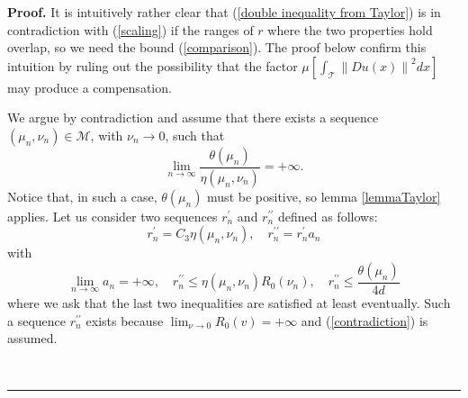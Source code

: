 \documentclass[11pt]{preprint}
\newenvironment{proof}[1][Proof]{\textbf{#1.} }{\ \rule{0.5em}{0.5em}}
\begin{document}
\begin{proof}
It is intuitively rather clear that (\ref{double inequality from Taylor}) is
in contradiction with (\ref{scaling}) if the ranges of $r$ where the two
properties hold overlap, so we need the bound (\ref{comparison}). The proof below confirm this intuition by ruling out the possibility that the factor $\mu\left[
\int_{\mathcal{T}}\left\|  Du\left(  x\right)  \right\|  ^{2}dx\right]  $ may
produce a compensation.

We argue by contradiction and assume that there exists a sequence $\left(
\mu_{n},\nu_{n}\right)  \in\mathcal{M}$, with $\nu_{n}\rightarrow0$, such
that
\begin{equation}
\lim_{n\rightarrow\infty}\frac{\theta\left(  \mu_{n}\right)  }{\eta\left(
\mu_{n},\nu_{n}\right)  }=+\infty.\label{contradiction}%
\end{equation}
Notice that, in such a case, $\theta\left(  \mu_{n}\right)  $ must be
positive, so lemma \ref{lemmaTaylor} applies. Let us consider two sequences
$r_{n}^{\prime}$ and $r_{n}^{\prime\prime}$ defined as follows:
\[
r_{n}^{\prime}=C_{3}\eta\left(  \mu_{n},\nu_{n}\right)  ,\quad r_{n}%
^{\prime\prime}=r_{n}^{\prime}a_{n}%
\]
with
\[
\lim_{n\rightarrow\infty}a_{n}=+\infty,\quad r_{n}^{\prime\prime}\leq
\eta\left(  \mu_{n},\nu_{n}\right)  R_{0}\left(  \nu_{n}\right)  ,\quad
r_{n}^{\prime\prime}\leq\frac{\theta\left(  \mu_{n}\right)  }{4d}%
\]
where we ask that the last two inequalities are satisfied at least eventually.
Such a sequence $r_{n}^{\prime\prime}$ exists because $\lim_{\nu\rightarrow
0}R_{0}\left(  v\right)  =+\infty$ and (\ref{contradiction}) is assumed.


\end{proof}
\end{document}
